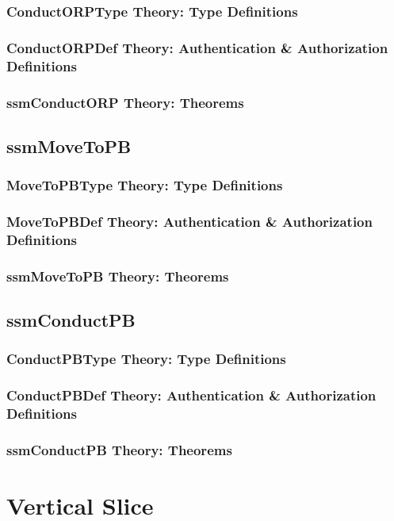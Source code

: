 \documentclass[hidelinks,12pt,a4paper]{report}
\begin{document}
\begin{appendices}
\subsubsection{ConductORPType Theory: Type Definitions}
\subsubsection{ConductORPDef Theory: Authentication \& Authorization Definitions}
\subsubsection{ssmConductORP Theory: Theorems}

\subsection{ssmMoveToPB}
\subsubsection{MoveToPBType Theory: Type Definitions}
\subsubsection{MoveToPBDef Theory: Authentication \& Authorization Definitions}
\subsubsection{ssmMoveToPB Theory: Theorems}

\subsection{ssmConductPB}
\subsubsection{ConductPBType Theory: Type Definitions}
\subsubsection{ConductPBDef Theory: Authentication \& Authorization Definitions}
\subsubsection{ssmConductPB Theory: Theorems}


\section{Vertical Slice}

\end{appendices}
\end{document}
